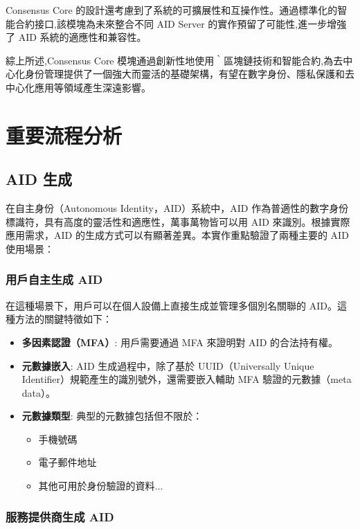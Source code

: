 Consensus Core 的設計還考慮到了系統的可擴展性和互操作性。通過標準化的智能合約接口,該模塊為未來整合不同 AID Server 的實作預留了可能性,進一步增強了 AID 系統的適應性和兼容性。

綜上所述,Consensus Core 模塊通過創新性地使用｀區塊鏈技術和智能合約,為去中心化身份管理提供了一個強大而靈活的基礎架構，有望在數字身份、隱私保護和去中心化應用等領域產生深遠影響。

\section{重要流程分析}
\subsection{AID 生成}

在自主身份（Autonomous Identity，AID）系統中，AID 作為普適性的數字身份標識符，具有高度的靈活性和適應性，萬事萬物皆可以用 AID 來識別。根據實際應用需求，AID 的生成方式可以有顯著差異。本實作重點驗證了兩種主要的 AID 使用場景：

\subsubsection{用戶自主生成 AID}

在這種場景下，用戶可以在個人設備上直接生成並管理多個別名關聯的 AID。這種方法的關鍵特徵如下：

\begin{itemize}
  \item \textbf{多因素認證（MFA）}: 用戶需要通過 MFA 來證明對 AID 的合法持有權。
  \item \textbf{元數據嵌入}: AID 生成過程中，除了基於 UUID（Universally Unique Identifier）規範產生的識別號外，還需要嵌入輔助 MFA 驗證的元數據（meta data）。
  \item \textbf{元數據類型}: 典型的元數據包括但不限於：
        \begin{itemize}
          \item 手機號碼
          \item 電子郵件地址
          \item 其他可用於身份驗證的資料...
        \end{itemize}
\end{itemize}

\subsubsection{服務提供商生成 AID}

